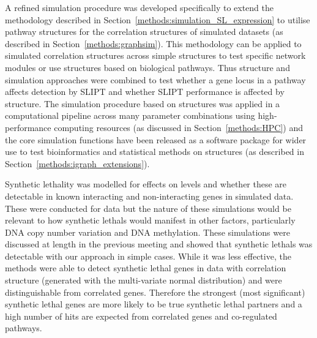 A refined simulation procedure was developed specifically to extend the methodology described in Section~\ref{methods:simulation_SL_expression} to utilise pathway  structures for the correlation structures of simulated datasets (as described in Section~\ref{methods:graphsim}). This methodology can be applied to simulated correlation structures across simple  structures to test specific network modules or use  structures based on biological pathways. Thus  structure and simulation approaches were combined to test whether a gene locus in a pathway affects detection by \gls{SLIPT} and whether \gls{SLIPT} performance is affected by  structure. The simulation procedure based on  structures was applied in a computational pipeline across many parameter combinations using high-performance computing resources (as discussed in Section~\ref{methods:HPC}) and the core simulation functions have been released as a software package for wider use to test \gls{bioinformatics} and statistical methods on  structures (as described in Section~\ref{methods:igraph_extensions}).

\iffalse
Synthetic lethality was modelled for effects on  levels and whether these are detectable in known interacting and non-interacting genes in simulated data. These were conducted for  data but the nature of these simulations would be relevant to how \glspl{synthetic lethal} would manifest in other factors, particularly \acrshort{DNA} \gls{copy number} variation and \acrshort{DNA} methylation. These simulations were discussed at length in the previous meeting and showed that \glspl{synthetic lethal} was detectable with our approach in simple cases. While it was less effective, the methods were able to detect \gls{synthetic lethal} genes in  data with correlation structure (generated with the multi-variate normal distribution) and were distinguishable from correlated genes. Therefore the strongest (most significant) \gls{synthetic lethal} genes are more likely to be true \gls{synthetic lethal} partners and a high number of hits are expected from correlated genes and co-regulated pathways.

